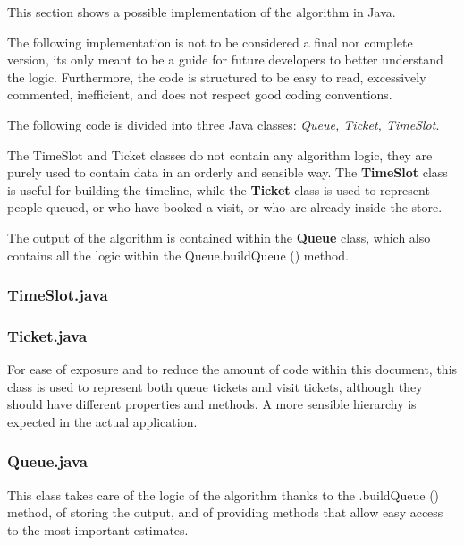 This section shows a possible implementation of the algorithm in Java.

The following implementation is not to be considered a final nor complete version, its only meant to be a guide for future developers to better understand the logic. Furthermore, the code is structured to be easy to read, excessively commented, inefficient, and does not respect good coding conventions.

The following code is divided into three Java classes: \textit{Queue, Ticket, TimeSlot}.

The TimeSlot and Ticket classes do not contain any algorithm logic, they are purely used to contain data in an orderly and sensible way. The \textbf{TimeSlot} class is useful for building the timeline, while the \textbf{Ticket} class is used to represent people queued, or who have booked a visit, or who are already inside the store.

The output of the algorithm is contained within the \textbf{Queue} class, which also contains all the logic within the Queue.buildQueue () method.


\subsubsection*{TimeSlot.java}
\label{subsubsect:timeslotjava}


\subsubsection*{Ticket.java}
\label{subsubsect:ticketjava}

For ease of exposure and to reduce the amount of code within this document, this class is used to represent both queue tickets and visit tickets, although they should have different properties and methods. A more sensible hierarchy is expected in the actual application.\newline
\newline


\subsubsection*{Queue.java}
\label{subsubsect:queuejava}

This class takes care of the logic of the algorithm thanks to the .buildQueue () method, of storing the output, and of providing methods that allow easy access to the most important estimates.

